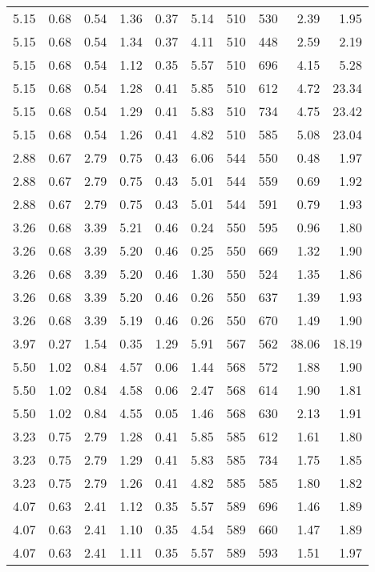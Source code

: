 \begin{longtable}{rrrrrrrrrr}
5.15	&	0.68	&	0.54	&	1.36	&	0.37	&	5.14	&	510	&	530	&	2.39	&	1.95	\\
5.15	&	0.68	&	0.54	&	1.34	&	0.37	&	4.11	&	510	&	448	&	2.59	&	2.19	\\
5.15	&	0.68	&	0.54	&	1.12	&	0.35	&	5.57	&	510	&	696	&	4.15	&	5.28	\\
5.15	&	0.68	&	0.54	&	1.28	&	0.41	&	5.85	&	510	&	612	&	4.72	&	23.34	\\
5.15	&	0.68	&	0.54	&	1.29	&	0.41	&	5.83	&	510	&	734	&	4.75	&	23.42	\\
5.15	&	0.68	&	0.54	&	1.26	&	0.41	&	4.82	&	510	&	585	&	5.08	&	23.04	\\
2.88	&	0.67	&	2.79	&	0.75	&	0.43	&	6.06	&	544	&	550	&	0.48	&	1.97	\\
2.88	&	0.67	&	2.79	&	0.75	&	0.43	&	5.01	&	544	&	559	&	0.69	&	1.92	\\
2.88	&	0.67	&	2.79	&	0.75	&	0.43	&	5.01	&	544	&	591	&	0.79	&	1.93	\\
3.26	&	0.68	&	3.39	&	5.21	&	0.46	&	0.24	&	550	&	595	&	0.96	&	1.80	\\
3.26	&	0.68	&	3.39	&	5.20	&	0.46	&	0.25	&	550	&	669	&	1.32	&	1.90	\\
3.26	&	0.68	&	3.39	&	5.20	&	0.46	&	1.30	&	550	&	524	&	1.35	&	1.86	\\
3.26	&	0.68	&	3.39	&	5.20	&	0.46	&	0.26	&	550	&	637	&	1.39	&	1.93	\\
3.26	&	0.68	&	3.39	&	5.19	&	0.46	&	0.26	&	550	&	670	&	1.49	&	1.90	\\
3.97	&	0.27	&	1.54	&	0.35	&	1.29	&	5.91	&	567	&	562	&	38.06	&	18.19	\\
5.50	&	1.02	&	0.84	&	4.57	&	0.06	&	1.44	&	568	&	572	&	1.88	&	1.90	\\
5.50	&	1.02	&	0.84	&	4.58	&	0.06	&	2.47	&	568	&	614	&	1.90	&	1.81	\\
5.50	&	1.02	&	0.84	&	4.55	&	0.05	&	1.46	&	568	&	630	&	2.13	&	1.91	\\
3.23	&	0.75	&	2.79	&	1.28	&	0.41	&	5.85	&	585	&	612	&	1.61	&	1.80	\\
3.23	&	0.75	&	2.79	&	1.29	&	0.41	&	5.83	&	585	&	734	&	1.75	&	1.85	\\
3.23	&	0.75	&	2.79	&	1.26	&	0.41	&	4.82	&	585	&	585	&	1.80	&	1.82	\\
4.07	&	0.63	&	2.41	&	1.12	&	0.35	&	5.57	&	589	&	696	&	1.46	&	1.89	\\
4.07	&	0.63	&	2.41	&	1.10	&	0.35	&	4.54	&	589	&	660	&	1.47	&	1.89	\\
4.07	&	0.63	&	2.41	&	1.11	&	0.35	&	5.57	&	589	&	593	&	1.51	&	1.97	\\

\end{longtable}
